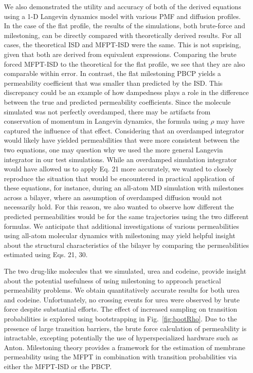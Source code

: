 	\par We also demonstrated the utility and accuracy of both of the derived equations using a 1-D Langevin dynamics model with various  PMF and diffusion profiles. In the case of the flat profile, the results of the simulations, both brute-force and milestoning, can be directly compared with theoretically derived results. For all cases, the theoretical ISD and MFPT-ISD were the same. This is not suprising, given that both are derived from equivalent expressions. Comparing the brute forced MFPT-ISD to the theoretical for the flat profile, we see that they are also comparable within error. In contrast, the flat milestoning PBCP yields a permeability coefficient that was smaller than predicted by the ISD. This discrepancy could be an example of how dampedness plays a role in the difference between the true and predicted permeability coefficients. Since the molecule simulated was not perfectly overdamped, there may be artifacts from conservation of momentum in Langevin dynamics, the formula using $\rho$ may have captured the influence of that effect.  Considering that an overdamped integrator would likely have yielded permeabilities that were more consistent between the two equations, one may question why we used the more general Langevin integrator in our test simulations. While an overdamped simulation integrator would have allowed us to apply Eq. 21 more accurately, we wanted to closely reproduce the situation that would be encountered in practical application of these equations, for instance, during an all-atom MD simulation with milestones across a bilayer, where an assumption of overdamped diffusion would not necessarily hold. For this reason, we also wanted to observe how different the predicted permeabilities would be for the same trajectories using the two different formulas.
	We anticipate that additional investigations of various permeabilities using all-atom molecular dynamics with milestoning may yield helpful insight about the structural characteristics of the bilayer by comparing the permeabilities estimated using Eqs. 21, 30.

	\par The two drug-like molecules that we simulated, urea and codeine, provide insight about the potential usefulness of using milestoning to approach practical permeability problems. We obtain quantitatively accurate results for both urea and codeine. Unfortunately, no crossing events for urea were observed by brute force despite substantial efforts. The effect of increased sampling on transition probabilities is explored using bootstrapping in Fig.~\ref{fig:bootRho}. Due to the presence of large transition barriers, the brute force calculation of permeability is intractable, excepting potentially the use of hyperspecialized hardware such as Anton\cite{Shaw2008}. Milestoning theory provides a framework for the estimation of membrane permeability using the MFPT in combination with transition probabilities via either the MFPT-ISD or the PBCP.

